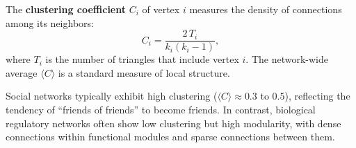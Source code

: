 The \textbf{clustering coefficient} $C_i$ of vertex $i$ measures the density of connections among its neighbors:
\[
C_i = \frac{2\,T_i}{k_i(k_i - 1)},
\]
where $T_i$ is the number of triangles that include vertex $i$. The network-wide average $\langle C \rangle$ is a standard measure of local structure.

\begin{example}
Social networks typically exhibit high clustering ($\langle C \rangle \approx 0.3$ to $0.5$), reflecting the tendency of ``friends of friends'' to become friends. In contrast, biological regulatory networks often show low clustering but high modularity, with dense connections within functional modules and sparse connections between them.
\end{example}

